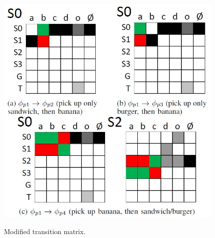 \documentclass[letterpaper, 10 pt, conference]{ieeeconf}  %
\begin{document}
\begin{figure}[h]
 \centering
 \includegraphics[scale=.5]{JacoarmTM.JPG}\\
 \caption{Modified transition matrix.}
\end{figure}
\end{document}
